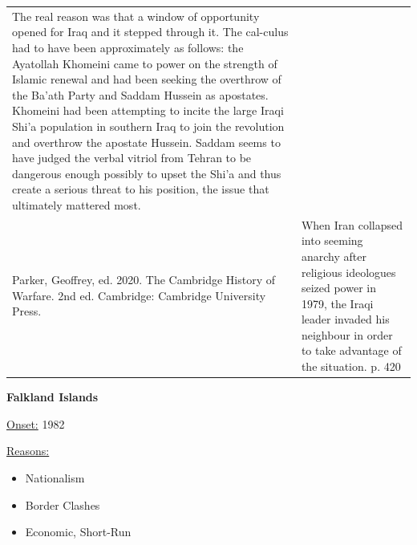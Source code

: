 {\begin{longtable}{p{}p{}}
The real reason was that a window of opportunity opened for Iraq and it stepped through it. The cal-culus had to have been approximately as follows: the Ayatollah Khomeini came to power on the strength of Islamic renewal and had been seeking the overthrow of the Ba'ath Party and Saddam Hussein as apostates. Khomeini had been attempting to incite the large Iraqi Shi'a population in southern Iraq to join the revolution and overthrow the apostate Hussein. Saddam seems to have judged the verbal vitriol from Tehran to be dangerous enough possibly to upset the Shi'a and thus create a serious threat to his position, the issue that ultimately mattered most.
\\
Parker, Geoffrey, ed. 2020. The Cambridge History of Warfare. 2nd ed. Cambridge: Cambridge University Press. & When Iran collapsed into seeming anarchy after religious ideologues seized power in 1979, the Iraqi leader invaded his neighbour in order to take advantage of the situation. p. 420
\\
\end{longtable}}
\clearpage
         \textbf{Falkland Islands} 

          \underline{Onset:} 1982         

\underline{Reasons:}
\begin{itemize}
\item Nationalism
\item Border Clashes
\item Economic, Short-Run
\end{itemize}

